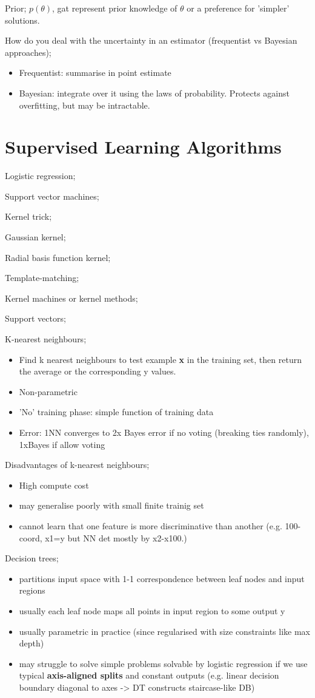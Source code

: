 \documentclass{article}
\begin{document}
Prior; $p(\theta)$, gat represent prior knowledge of $\theta$ or a preference for 'simpler' solutions.

How do you deal with the uncertainty in an estimator (frequentist vs Bayesian approaches); \begin{itemize}
	\item Frequentist: summarise in point estimate
	\item Bayesian: integrate over it using the laws of probability. Protects against overfitting, but may be intractable.
\end{itemize}

\section{Supervised Learning Algorithms}

Logistic regression;

Support vector machines;

Kernel trick;

Gaussian kernel;

Radial basis function kernel;

Template-matching;

Kernel machines or kernel methods;

Support vectors;

K-nearest neighbours; \begin{itemize}
	\item Find k nearest neighbours to test example \textbf{x} in the training set, then return the average or the corresponding y values.
	\item Non-parametric
	\item 'No' training phase: simple function of training data
	\item Error: 1NN converges to 2x Bayes error if no voting (breaking ties randomly), 1xBayes if allow voting
\end{itemize} 

Disadvantages of k-nearest neighbours; \begin{itemize}
	\item High compute cost
	\item may generalise poorly with small finite trainig set
	\item cannot learn that one feature is more discriminative than another (e.g. 100-coord, x1=y but NN det mostly by x2-x100.)
\end{itemize}

Decision trees; \begin{itemize}
	\item partitions input space with 1-1 correspondence between leaf nodes and input regions
	\item usually each leaf node maps all points in input region to some output y
	\item usually parametric in practice (since regularised with size constraints like max depth)
	\item may struggle to solve simple problems solvable by logistic regression if we use typical \textbf{axis-aligned splits} and constant outputs (e.g. linear decision boundary diagonal to axes -> DT constructs staircase-like DB)
\end{itemize}
\end{document}
